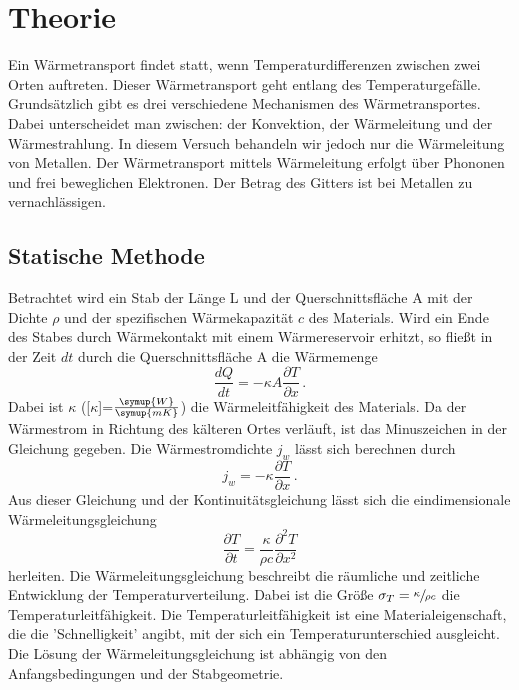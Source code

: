 \section{Theorie}
\label{sec:Theorie}
Ein Wärmetransport findet statt, wenn Temperaturdifferenzen zwischen zwei Orten auftreten.
Dieser Wärmetransport geht entlang des Temperaturgefälle. Grundsätzlich gibt es drei verschiedene Mechanismen des Wärmetransportes.
Dabei unterscheidet man zwischen: der Konvektion, der Wärmeleitung und der Wärmestrahlung.
In diesem Versuch behandeln wir jedoch nur die Wärmeleitung von Metallen.
Der Wärmetransport mittels Wärmeleitung erfolgt über Phononen und frei beweglichen Elektronen. Der Betrag des Gitters ist bei Metallen zu vernachlässigen.
\subsection{Statische Methode}
\label{sec:stM}
Betrachtet wird ein Stab der Länge L und der Querschnittsfläche A mit der Dichte $\rho$ und der spezifischen Wärmekapazität $c$ des Materials.
Wird ein Ende des Stabes durch Wärmekontakt mit einem Wärmereservoir erhitzt, so fließt in der Zeit $dt$ durch die Querschnittsfläche A die Wärmemenge
\begin{equation}
    \frac{dQ}{dt}=-\kappa A \frac{\partial T}{\partial x} \,.
    \label{eqn:Wärmemenge}
\end{equation}
Dabei ist $\kappa$ ([$\kappa$]=$\frac{\symup{W}}{\symup{m K}}$) die Wärmeleitfähigkeit des Materials. Da der Wärmestrom 
in Richtung des kälteren Ortes verläuft, ist das Minuszeichen in der Gleichung gegeben. Die Wärmestromdichte $j_w$ lässt sich berechnen durch
\begin{equation}
    j_w=-\kappa \frac{\partial T}{\partial x}\,.
    \label{eqn:wärmedichte}
\end{equation}
Aus dieser Gleichung und der Kontinuitätsgleichung lässt sich die eindimensionale Wärmeleitungsgleichung
\begin{equation}
    \frac{\partial T}{\partial t}=\frac{\kappa}{\rho c}\frac{\partial^2 T}{\partial x^2}
    \label{eqn:Wärmeleitungsgleichung}
\end{equation}
herleiten. Die Wärmeleitungsgleichung beschreibt die räumliche und zeitliche Entwicklung der Temperaturverteilung. Dabei ist die Größe $\sigma_T=\sfrac{\kappa}{\rho c}$
die Temperaturleitfähigkeit. Die Temperaturleitfähigkeit ist eine Materialeigenschaft, die die 'Schnelligkeit' angibt, mit der sich ein Temperaturunterschied ausgleicht.
Die Lösung der Wärmeleitungsgleichung ist abhängig von den Anfangsbedingungen und der Stabgeometrie.
